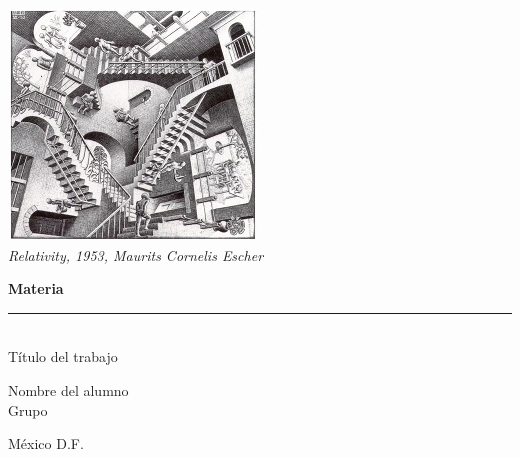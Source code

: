
\begin{titlepage}

    \centering %

    \includegraphics{imagenes/pvisual.jpg} %
    \textit{\\ Relativity, 1953, Maurits Cornelis Escher} %

    \vspace{1cm} %

    \LARGE \textbf{Materia\\}
    \rule{7cm}{3pt} %
    \LARGE {\\T\'itulo del trabajo}

    \vspace{1cm} %

    Nombre del alumno\\
    Grupo

    \vspace{1cm} %

    M\'exico D.F.\\
    

\end{titlepage}
